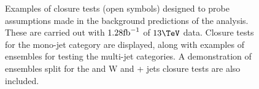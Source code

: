 \begin{figure}[h!]
\begin{center}
    \caption{Examples of closure tests (open symbols) designed to
    probe assumptions made in the background predictions of the
    analysis. These are carried out with $1.28\text{fb}^{-1}$ of $13\tev$ data. 
    Closure tests for the mono-jet category are displayed, along with
    examples of ensembles for testing the multi-jet categories. A
    demonstration of ensembles split for the \znunu and W and \ttbar +
    jets closure tests are also included.
    }
    \label{fig:ttWclosureDataSym}
  \end{center} 
\end{figure}




%

